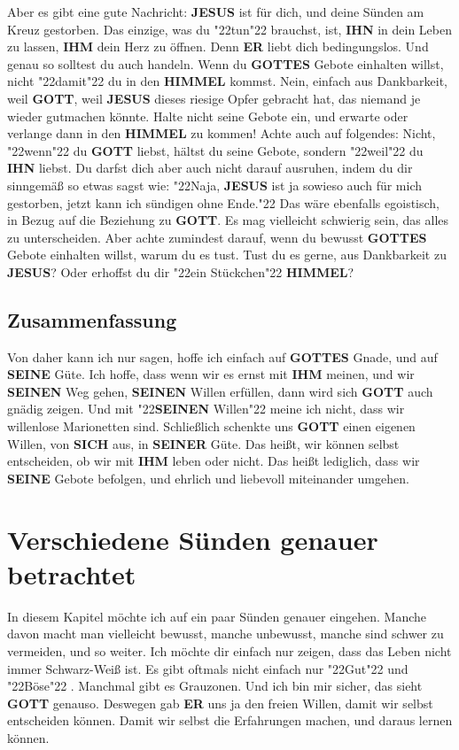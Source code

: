 \documentclass[10pt,a5paper]{article}
\newcommand{\Er}[0]{\textbf{ER}}
\newcommand{\Gottes}[0]{\textbf{GOTTES}}
\newcommand{\Gott}[0]{\textbf{GOTT}}
\newcommand{\Himmel}[0]{\textbf{HIMMEL}}
\newcommand{\Ihm}[0]{\textbf{IHM}}
\newcommand{\Ihn}[0]{\textbf{IHN}}
\newcommand{\Jesus}[0]{\textbf{JESUS}}
\newcommand{\Seinen}[0]{\textbf{SEINEN}}
\newcommand{\Seiner}[0]{\textbf{SEINER}}
\newcommand{\Seine}[0]{\textbf{SEINE}}
\newcommand{\Sich}[0]{\textbf{SICH}}
\newcommand{\q}[1]{\char"22{#1}\char"22 }
\begin{document}
		Aber es gibt eine gute Nachricht:
		{\Jesus} ist f\"ur dich,
		und deine S\"unden am Kreuz gestorben.
		Das einzige,
		was du \q{tun} brauchst,
		ist,
		{\Ihn} in dein Leben zu lassen,
		{\Ihm} dein Herz zu \"offnen.
		Denn {\Er} liebt dich bedingungslos.
		Und genau so solltest du auch handeln.
		Wenn du {\Gottes} Gebote einhalten willst,
		nicht \q{damit} du in den {\Himmel} kommst.
		Nein,
		einfach aus Dankbarkeit,
		weil {\Gott},
		weil {\Jesus} dieses riesige Opfer gebracht hat,
		das niemand je wieder gutmachen k\"onnte.
		Halte nicht seine Gebote ein,
		und erwarte oder verlange dann in den {\Himmel} zu kommen!
		Achte auch auf folgendes:
		Nicht,
		\q{wenn} du {\Gott} liebst, h\"altst du seine Gebote,
		sondern \q{weil} du {\Ihn} liebst.
		Du darfst dich aber auch nicht darauf ausruhen,
		indem du dir sinngem\"a{\ss} so etwas sagst wie:
		\q{Naja,
		{\Jesus} ist ja sowieso auch f\"ur mich gestorben,
		jetzt kann ich s\"undigen ohne Ende.}
		Das w\"are ebenfalls egoistisch,
		in Bezug auf die Beziehung zu {\Gott}.
		Es mag vielleicht schwierig sein,
		das alles zu unterscheiden.
		Aber achte zumindest darauf,
		wenn du bewusst {\Gottes} Gebote einhalten willst,
		warum du es tust.
		Tust du es gerne,
		aus Dankbarkeit zu {\Jesus}?
		Oder erhoffst du dir \q{ein St\"uckchen} {\Himmel}?
		
	\subsection{Zusammenfassung}
		Von daher kann ich nur sagen,
		hoffe ich einfach auf {\Gottes} Gnade,
		und auf {\Seine} G\"ute.
		Ich hoffe,
		dass wenn wir es ernst mit {\Ihm} meinen,
		und wir {\Seinen} Weg gehen,
		{\Seinen} Willen erf\"ullen,
		dann wird sich {\Gott} auch gn\"adig zeigen.
		Und mit \q{{\Seinen} Willen} meine ich nicht,
		dass wir willenlose Marionetten sind.
		Schlie{\ss}lich schenkte uns {\Gott} einen eigenen Willen,
		von {\Sich} aus,
		in {\Seiner} G\"ute.
		Das hei{\ss}t,
		wir k\"onnen selbst entscheiden,
		ob wir mit {\Ihm} leben oder nicht.
		Das hei{\ss}t lediglich,
		dass wir {\Seine} Gebote befolgen,
		und ehrlich und liebevoll miteinander umgehen.

	\newpage
	\section{Verschiedene S\"unden genauer betrachtet}
		In diesem Kapitel m\"ochte ich auf ein paar S\"unden genauer eingehen.
		Manche davon macht man vielleicht bewusst,
		manche unbewusst,
		manche sind schwer zu vermeiden,
		und so weiter.
		Ich m\"ochte dir einfach nur zeigen,
		dass das Leben nicht immer Schwarz-Wei{\ss} ist.
		Es gibt oftmals nicht einfach nur \q{Gut} und \q{B\"ose}.
		Manchmal gibt es Grauzonen.
		Und ich bin mir sicher,
		das sieht {\Gott} genauso.
		Deswegen gab {\Er} uns ja den freien Willen,
		damit wir selbst entscheiden k\"onnen.
		Damit wir selbst die Erfahrungen machen,
		und daraus lernen k\"onnen.
\end{document}
